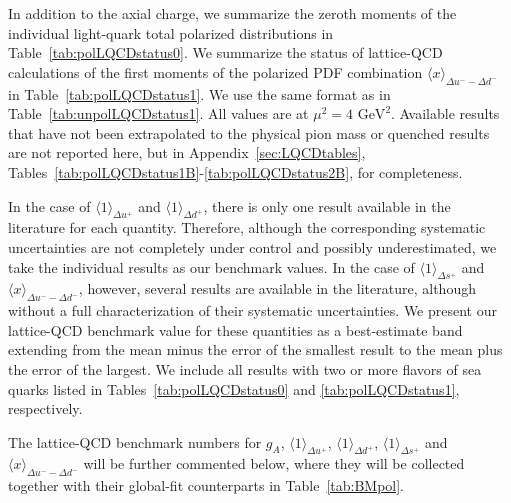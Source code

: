 In addition to the axial charge, we summarize the zeroth moments of the 
individual light-quark total polarized distributions in 
Table~\ref{tab:polLQCDstatus0}. 
%
We summarize the status of lattice-QCD calculations of the
first moments of the polarized PDF combination 
$\langle x \rangle_{\Delta u^- - \Delta d^-}$ in Table~\ref{tab:polLQCDstatus1}. 
%
We use the same format as in Table~\ref{tab:unpolLQCDstatus1}.
%
All values are at $\mu^2=4\mbox{ GeV}^2$.
%
Available results that have not been extrapolated to the physical pion mass
or quenched results are not reported here, but in Appendix~\ref{sec:LQCDtables},
Tables~\ref{tab:polLQCDstatus1B}-\ref{tab:polLQCDstatus2B}, for completeness.

In the case of $\langle 1 \rangle_{\Delta u^+}$ and $\langle 1 \rangle_{\Delta d^+}$,
there is only one result available in the literature for each quantity.
%
Therefore, although the corresponding systematic uncertainties are not 
completely under control and possibly underestimated, we take the individual 
results as our benchmark values.
%
In the case of $\langle 1 \rangle_{\Delta s^+}$ and 
$\langle x \rangle_{\Delta u^- - \Delta d^-}$, however, several results are available
in the literature, although without a full characterization of
their systematic uncertainties.
%
We present our lattice-QCD benchmark value for these quantities as
a best-estimate band extending from the mean minus the error of the 
smallest result to the mean plus the error of the largest. 
%
We include all results with two or more flavors of sea quarks listed in 
Tables~\ref{tab:polLQCDstatus0} and \ref{tab:polLQCDstatus1}, respectively.

The lattice-QCD benchmark numbers for $g_A$,
$\langle 1 \rangle_{\Delta u^+}$, $\langle 1 \rangle_{\Delta d^+}$,
$\langle 1 \rangle_{\Delta s^+}$ and $\langle x \rangle_{\Delta u^- - \Delta d^-}$
will be further commented below, where they will be collected together 
with their global-fit counterparts in Table~\ref{tab:BMpol}.

